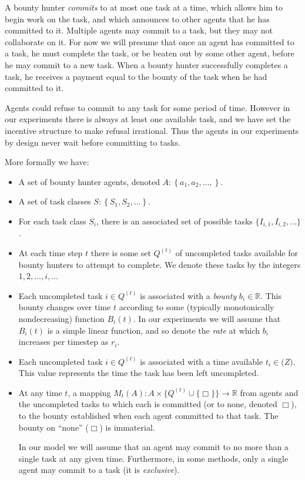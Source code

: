 \documentclass[letterpaper]{aamas2015}
\begin{document}
A bounty hunter {\it commits} to at most one task at a time, which allows him to begin work on the task, and which announces to other agents that he has committed to it.  Multiple agents may commit to a task, but they may not collaborate on it.  For now we will presume that once an agent has committed to a task, he must complete the task, or be beaten out by some other agent, before he may commit to a new task.  When a bounty hunter successfully completes a task, he receives a payment equal to the bounty of the task when he had committed to it.

Agents could refuse to commit to any task for some period of time.  However in our experiments there is always at least one available task, and we have set the incentive structure to make refusal irrational.  Thus the agents in our experiments by design never wait before committing to tasks.

More formally we have:

\begin{itemize}
  \item A set of bounty hunter agents, denoted \(A : \left \{a_1, a_2, ...,\right\}\). 
  \item A set of task classes \(S : \left \{S_1, S_2, ... \right \} \).
  \item For each task class \(S_i\), there is an associated set of possible tasks  \(\{I_{i,1}, I_{i,2}, ... \}\).
  \item At each time step \(t\) there is some set \(Q^{(t)}\) of uncompleted tasks available for bounty hunters to attempt to complete.  We denote these tasks by the integers \(1, 2, ..., i, ...\)
  \item Each uncompleted task \(i \in Q^{(t)}\) is associated with a {\it bounty} \(b_i \in \mathbb{R}\). This bounty changes over time \(t\) according to some (typically monotonically nondecreasing) function \(B_{i}(t)\).  In our experiments we will assume that \(B_{i}(t)\) is a simple linear function, and so denote the {\it rate} at which \(b_i\) increases per timestep as \(r_i\).
  \item Each uncompleted task \(i \in Q^(t)\) is associated with a time available \(t_i \in \mathbb(Z)\).  This value represents the time the task has been left uncompleted.
  \item At any time \(t\), a mapping \(M_t(A) : A \times \{ Q^{(t)} \cup \{ \Box\} \} \rightarrow \mathbb{R} \) from agents and the uncompleted tasks to which each is committed (or to none, denoted \(\Box\)), to the bounty established when each agent committed to that task.  The bounty on ``none'' (\(\Box\)) is immaterial. 
  
In our model we will assume that an agent may commit to no more than a single task at any given time.  Furthermore, in some methods, only a single agent may commit to a task (it is {\it exclusive}).

\end{itemize}
\end{document}
